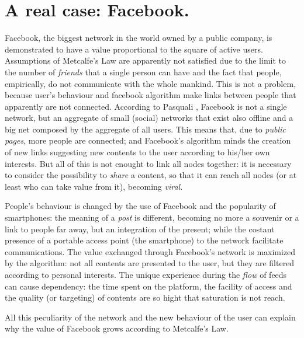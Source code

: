 \documentclass[12pt, a4page]{article}
\begin{document}
\section{A real case: Facebook.}
Facebook, the biggest network in the world owned by a public company, is demonstrated to have a value proportional to the square of active users. %
Assumptions of Metcalfe's Law are apparently not satisfied due to the limit to the number of \textit{friends} that a single person can have and the fact that people, empirically, do not communicate with the whole mankind.
This is not a problem, because user's behaviour and facebook algorithm make links between people that apparently are not connected.
According to Pasquali %
, Facebook is not a single network, but an aggregate of small (social) networks that exist also offline and a big net composed by the aggregate of all users.
This means that, due to \textit{public pages}, more people are connected; and Facebook's algorithm minds the creation of new links suggesting new contents to the user according to his/her own interests. \newline
But all of this is not enought to link all nodes together: it is necessary to consider the possibility to \textit{share} a content, so that it can reach all nodes (or at least who can take value from it), becoming \textit{viral}. \newline

People's behaviour is changed by the use of Facebook and the popularity of smartphones: the meaning of a \textit{post} is different, becoming no more a souvenir or a link to people far away, but an integration of the present; while the costant presence of a portable access point (the smartphone) to the network facilitate communications. \newline
The value exchanged through Facebook's network is maximized by the algorithm: not all contents are presented to the user, but they are filtered according to personal interests.
The unique experience during the \textit{flow} of feeds can cause dependency: the time spent on the platform, the facility of access and the quality (or targeting) of contents are so hight that saturation is not reach. \newline

All this peculiarity of the network and the new behaviour of the user can explain why the value of Facebook grows according to Metcalfe's Law.


\end{document}
